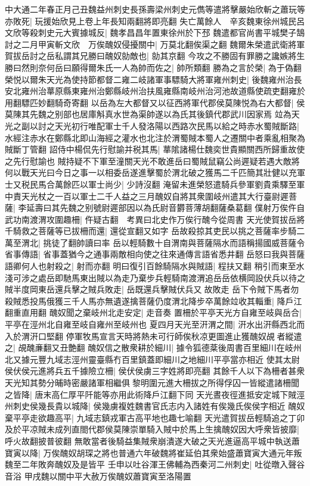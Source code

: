 中大通二年春正月己丑魏益州刺史長孫壽梁州刺史元儁等遣將擊嚴始欣斬之蕭玩等亦敗死|{
	玩援始欣見上卷上年長知兩翻將即亮翻}
失亡萬餘人　辛亥魏東徐州城民呂文欣等殺刺史元大賓據城反|{
	魏孝昌昌年置東徐州於下邳}
魏遣都官尚書平城樊子鵠討之二月甲寅斬文欣　万俟醜奴侵擾關中|{
	万莫北翻俟渠之翻}
魏爾朱榮遣武衛將軍賀拔岳討之岳私謂其兄勝曰醜奴勍敵也|{
	勍其京翻}
今攻之不勝固有罪勝之讒嫉將生勝曰然則奈何岳曰願得爾朱氏一人為帥而佐之|{
	帥所類翻}
勝為之言於榮|{
	為于偽翻}
榮悦以爾朱天光為使持節都督二雍二岐諸軍事驃騎大將軍雍州刺史|{
	後魏雍州治長安北雍州治蕐原縣東雍州治鄭縣岐州治扶風雍縣南岐州治河池故道縣使疏吏翻雍於用翻驃匹妙翻騎奇寄翻}
以岳為左大都督又以征西將軍代郡侯莫陳悦為右大都督|{
	侯莫陳其先魏之别部也居庫斛真水世為渠帥遂以為氏其後鎮代郡武川因家焉}
竝為天光之副以討之天光初行唯配軍士千人發洛陽以西路次民馬以給之時赤水蜀賊斷路|{
	水經注赤水在鄭縣北即山海經之灌水也北注於渭蜀賊本蜀人之遷關中者乘亂相聚為賊斷丁管翻}
詔侍中楊侃先行慰諭并税其馬|{
	蕐隂諸楊仕魏奕世貴顯關西所歸重故使之先行慰諭也}
賊持疑不下軍至潼關天光不敢進岳曰蜀賊鼠竊公尚遲疑若遇大敵將何以戰天光曰今日之事一以相委岳遂進擊蜀於渭北破之獲馬二千匹簡其壯健以充軍士又税民馬合萬餘匹以軍士尚少|{
	少詩沒翻}
淹留未進榮怒遣騎兵參軍劉貴乘驛至軍中責天光杖之一百以軍士二千人益之三月醜奴自將其衆圍岐州遣其大行臺尉遲菩薩|{
	李延壽曰其先魏之别號尉遲部因以為氏尉音欝菩薄胡翻薩桑葛翻}
僕射万俟仵自武功南渡渭攻圍趣柵|{
	仵疑古翻　考異曰北史作万俟行醜今從周書}
天光使賀拔岳將千騎救之菩薩等已拔柵而還|{
	還從宣翻又如字}
岳故殺掠其吏民以挑之菩薩率步騎二萬至渭北|{
	挑徒了翻帥讀曰率}
岳以輕騎數十自渭南與菩薩隔水而語稱揚國威菩薩令省事傳語|{
	省事蓋猶今之通事兩敵相向使之往來通傳言語省悉井翻}
岳怒曰我與菩薩語卿何人也射殺之|{
	射而亦翻}
明曰復引百餘騎隔水與賊語|{
	程扶又翻}
稍引而東至水淺可涉之處岳即馳馬東出賊以為走乃棄步兵輕騎南渡渭追岳岳依横岡設伏兵以待之賊半度岡東岳還兵擊之賊兵敗走|{
	岳既還兵擊賊伏兵又故敗走}
岳下令賊下馬者勿殺賊悉投馬俄獲三千人馬亦無遺遂擒菩薩仍度渭北降步卒萬餘竝收其輜重|{
	降戶江翻重直用翻}
醜奴聞之棄岐州北走安定|{
	走音奏}
置柵於平亭天光方自雍至岐與岳合|{
	平亭在涇州北自雍至岐自雍州至岐州也}
夏四月天光至汧渭之間|{
	汧水出汧縣西北而入於渭汧口堅翻}
停軍牧馬宣言天時將熱未可行師俟秋凉更圖進止獲醜奴覘者縱遣之|{
	覘醜亷翻又丑艶翻}
醜奴信之散衆耕於細川|{
	據令狐德棻後周書百里細川在岐州北又據元豐九域志涇州靈臺縣冇百里鎮蓋即細川之地細川平亭當亦相近}
使其太尉侯伏侯元進將兵五千據險立柵|{
	侯伏侯虜三字姓將即亮翻}
其餘千人以下為柵者甚衆天光知其勢分晡時密嚴諸軍相繼俱黎明圍元進大柵拔之所得俘囚一皆縱遣諸柵聞之皆降|{
	唐末高仁厚平阡能等亦用此術降戶江翻下同}
天光晝夜徑進抵安定城下賊涇州刺史侯幾長貴以城降|{
	侯幾虜複姓魏書官氏志内入諸姓有俟幾氏俟侯字相近}
醜奴棄平亭走欲趣高平|{
	九域志鎮戎軍古高平地也趣七喻翻}
天光遣賀拔岳輕騎追之丁卯及於平凉賊未成列直閤代郡侯莫陳崇單騎入賊中於馬上生擒醜奴因大呼衆皆披靡|{
	呼火故翻披普彼翻}
無敢當者後騎益集賊衆崩潰遂大破之天光進逼高平城中執送蕭寶寅以降|{
	万俟醜奴胡琛之將也普通六年破魏將崔延伯其衆始盛蕭寶寅大通元年叛魏至二年敗奔醜奴及是皆平}
壬申以吐谷渾王佛輔為西秦河二州刺史|{
	吐從暾入聲谷音浴}
甲戌魏以關中平大赦万俟醜奴蕭寶寅至洛陽置

